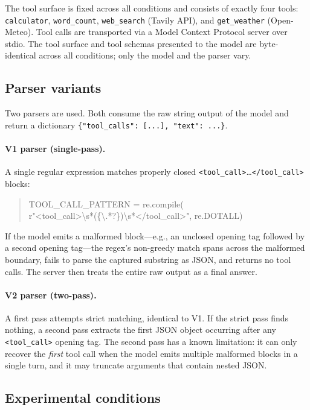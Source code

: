 \documentclass[10pt,twocolumn]{article}
\newcommand{\code}[1]{\texttt{#1}}
\begin{document}
The tool surface is fixed across all conditions and consists of exactly four tools: \code{calculator}, \code{word\_count}, \code{web\_search} (Tavily API), and \code{get\_weather} (Open-Meteo). Tool calls are transported via a Model Context Protocol server over stdio. The tool surface and tool schemas presented to the model are byte-identical across all conditions; only the model and the parser vary.

\subsection{Parser variants}

Two parsers are used. Both consume the raw string output of the model and return a dictionary \code{\{"tool\_calls": [...], "text": ...\}}.

\paragraph{V1 parser (single-pass).} A single regular expression matches properly closed \code{<tool\_call>}\ldots\code{</tool\_call>} blocks:
\begin{quote}\footnotesize\ttfamily
TOOL\_CALL\_PATTERN = re.compile(\\
\hspace*{1em}r"<tool\_call>\textbackslash s*(\{\textbackslash .*?\})\textbackslash s*</tool\_call>", re.DOTALL)
\end{quote}
If the model emits a malformed block---e.g., an unclosed opening tag followed by a second opening tag---the regex's non-greedy match spans across the malformed boundary, fails to parse the captured substring as JSON, and returns no tool calls. The server then treats the entire raw output as a final answer.

\paragraph{V2 parser (two-pass).} A first pass attempts strict matching, identical to V1. If the strict pass finds nothing, a second pass extracts the first JSON object occurring after any \code{<tool\_call>} opening tag. The second pass has a known limitation: it can only recover the \emph{first} tool call when the model emits multiple malformed blocks in a single turn, and it may truncate arguments that contain nested JSON.

\subsection{Experimental conditions}
\end{document}
